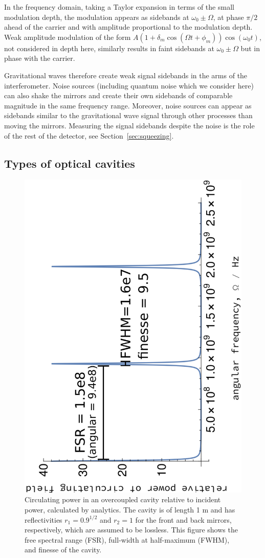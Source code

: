 \documentclass[aps,pra,superscriptaddress,reprint,nofootinbib]{revtex4-1}
\begin{document}
In the frequency domain, taking a Taylor expansion in terms of the small modulation depth, the modulation appears as sidebands at $\omega_0 \pm \Omega$, at phase $\pi/2$ ahead of the carrier and with amplitude proportional to the modulation depth.
Weak amplitude modulation of the form $A (1 + \delta_m \cos(\Omega t + \phi_m)) \cos(\omega_0 t)$, not considered in depth here, similarly results in faint sidebands at $\omega_0 \pm \Omega$ but in phase with the carrier.


Gravitational waves therefore create weak signal sidebands in the arms of the interferometer. Noise sources (including quantum noise which we consider here) can also shake the mirrors and create their own sidebands of comparable magnitude in the same frequency range. Moreover, noise sources can appear as sidebands similar to the gravitational wave signal through other processes than moving the mirrors. Measuring the signal sidebands despite the noise is the role of the rest of the detector, see Section~\ref{sec:squeezing}.


\subsection{Types of optical cavities}

\begin{figure}[h]
	\begin{center}
	\includegraphics[height=0.45\textwidth, angle=-90]{figures/cavity_fsr_fwhm_finesse.pdf}
	\end{center}
	\caption{Circulating power in an overcoupled cavity relative to incident power, calculated by analytics. The cavity is of length 1 m and has reflectivities $r_1 = 0.9^{1/2}$ and $r_2 = 1$ for the front and back mirrors, respectively, which are assumed to be lossless. This figure shows the free spectral range (FSR), full-width at half-maximum (FWHM), and finesse of the cavity.}
	\label{fig:cavity_fsr_fwhm_finesse}
\end{figure}
\end{document}
